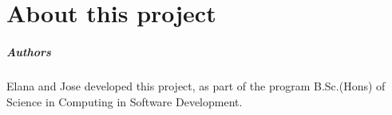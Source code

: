 \chapter*{About this project}

\paragraph{Authors}
Elana and Jose developed this project, as part of the program B.Sc.(Hons) of Science in Computing in Software Development.